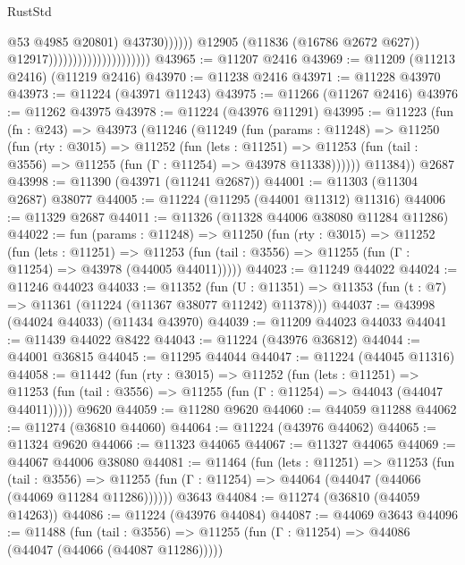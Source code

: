 \begin{lexlean}{RustStd}
\begin{coremodule}
                                                            @53
                                                            @4985
                                                            @20801)
                                                          @43730))))))
                                              @12905
                                              (@11836 (@16786 @2672 @627))
                                              @12917)))))))))))))))))))))
@43965 := @11207 @2416
@43969 := @11209 (@11213 @2416) (@11219 @2416)
@43970 := @11238 @2416
@43971 := @11228 @43970
@43973 := @11224 (@43971 @11243)
@43975 := @11266 (@11267 @2416)
@43976 := @11262 @43975
@43978 := @11224 (@43976 @11291)
@43995 := @11223
    (fun (fn : @243) =>
    @43973
      (@11246
        (@11249
          (fun (params : @11248) =>
          @11250
            (fun (rty : @3015) =>
            @11252
              (fun (lets : @11251) =>
              @11253 (fun (tail : @3556) => @11255 (fun (Γ : @11254) => @43978 @11338))))))
        @11384))
    @2687
@43998 := @11390 (@43971 (@11241 @2687))
@44001 := @11303 (@11304 @2687) @38077
@44005 := @11224 (@11295 (@44001 @11312) @11316)
@44006 := @11329 @2687
@44011 := @11326 (@11328 @44006 @38080 @11284 @11286)
@44022 := fun (params : @11248) =>
  @11250
    (fun (rty : @3015) =>
    @11252
      (fun (lets : @11251) =>
      @11253 (fun (tail : @3556) => @11255 (fun (Γ : @11254) => @43978 (@44005 @44011)))))
@44023 := @11249 @44022
@44024 := @11246 @44023
@44033 := @11352
    (fun (U : @11351) => @11353 (fun (t : @7) => @11361 (@11224 (@11367 @38077 @11242) @11378)))
@44037 := @43998 (@44024 @44033) (@11434 @43970)
@44039 := @11209 @44023 @44033
@44041 := @11439 @44022 @8422
@44043 := @11224 (@43976 @36812)
@44044 := @44001 @36815
@44045 := @11295 @44044
@44047 := @11224 (@44045 @11316)
@44058 := @11442
    (fun (rty : @3015) =>
    @11252
      (fun (lets : @11251) =>
      @11253 (fun (tail : @3556) => @11255 (fun (Γ : @11254) => @44043 (@44047 @44011)))))
    @9620
@44059 := @11280 @9620
@44060 := @44059 @11288
@44062 := @11274 (@36810 @44060)
@44064 := @11224 (@43976 @44062)
@44065 := @11324 @9620
@44066 := @11323 @44065
@44067 := @11327 @44065
@44069 := @44067 @44006 @38080
@44081 := @11464
    (fun (lets : @11251) =>
    @11253
      (fun (tail : @3556) =>
      @11255 (fun (Γ : @11254) => @44064 (@44047 (@44066 (@44069 @11284 @11286))))))
    @3643
@44084 := @11274 (@36810 (@44059 @14263))
@44086 := @11224 (@43976 @44084)
@44087 := @44069 @3643
@44096 := @11488
    (fun (tail : @3556) => @11255 (fun (Γ : @11254) => @44086 (@44047 (@44066 (@44087 @11286)))))

\end{coremodule}
\end{lexlean}
